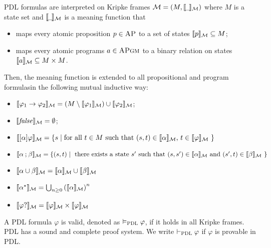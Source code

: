 \documentclass{amsart}
\begin{document}
PDL formulas are interpreted on Kripke frames
$\mathcal{M} = (M,{\llbracket{\!\_\!}\rrbracket_{\mathcal{M}}})$ where $M$ is a state set and 
${\llbracket{\!\_\!}\rrbracket_{\mathcal{M}}}$ is a meaning function that
\begin{itemize}
	\item maps every atomic proposition $p \in \textsc{AP}$ to a set of states ${\llbracket p\rrbracket_{\mathcal{M}}}
	\subseteq M$;
	\item maps every atomic programs $a \in \textsc{APgm}$ to a binary relation on states
	${\llbracket a\rrbracket_{\mathcal{M}}} \subseteq M \times M$.
\end{itemize}
Then, the meaning function is extended to all propositional and program formulasin the following mutual inductive way:
\begin{itemize}
	\item ${\llbracket\varphi_1 \to \varphi_2\rrbracket_{\mathcal{M}}} = 
	(M \setminus {\llbracket\varphi_1\rrbracket_{\mathcal{M}}}) \cup {\llbracket\varphi_2\rrbracket_{\mathcal{M}}}$;
	\item ${\llbracket\mathit{false}\rrbracket_{\mathcal{M}}} = \emptyset$;
	\item ${\llbracket[\alpha] \varphi\rrbracket_{\mathcal{M}}}
	= \{ s \mid \text{for all $t \in M$ such that $(s,t) \in {\llbracket\alpha\rrbracket_{\mathcal{M}}}$,                         $t \in {\llbracket\varphi\rrbracket_{\mathcal{M}}}$ } \}$
	\item ${\llbracket\alpha \mathbin{;} \beta\rrbracket_{\mathcal{M}}} =
	\{ (s,t) \mid \text{
		there exists a state $s'$ such that
		$(s,s') \in {\llbracket\alpha\rrbracket_{\mathcal{M}}}$ and $(s',t) \in {\llbracket\beta\rrbracket_{\mathcal{M}}}$
	} \}$
	\item ${\llbracket\alpha \mathbin{\cup} \beta\rrbracket_{\mathcal{M}}} =
	{\llbracket\alpha\rrbracket_{\mathcal{M}}} \cup {\llbracket\beta\rrbracket_{\mathcal{M}}}$
	\item ${\llbracket\alpha ^*\rrbracket_{\mathcal{M}}} =
	\bigcup_{n \ge 0} \left({\llbracket\alpha\rrbracket_{\mathcal{M}}}\right)^n$
	\item ${\llbracket\varphi{?}\rrbracket_{\mathcal{M}}} = {\llbracket\varphi\rrbracket_{\mathcal{M}}} \times
	{\llbracket\varphi\rrbracket_{\mathcal{M}}}$
\end{itemize}
A PDL formula $\varphi$ is valid, denoted as $\vDash_{\textsc{PDL}} \varphi$,
if it holds in all Kripke frames.
PDL has a sound and complete proof system.
We write $\vdash_{\textsc{PDL}} \varphi$ if $\varphi$ is provable in PDL.
\end{document}

